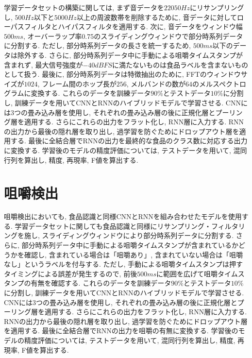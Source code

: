 学習データセットの構築に関しては, まず音データを$22050Hz$にリサンプリングし, $500Hz$以下と$5000Hz$以上の周波数帯を削除するために, 音データに対してローパスフィルタとハイパスフィルタを適用する. 次に, 音データをウィンドウ幅$500ms$, オーバーラップ率$0.75$のスライディングウィンドウで部分時系列データに分割する. ただし, 部分時系列データの長さを統一するため, $500ms$以下のデータは除外する. さらに, 部分時系列データ中に手動による咀嚼タイムスタンプが含まれず, 最大信号強度が$-40dBFS$に満たないものは食品ラベルを含まないものとして扱う. 最後に, 部分時系列データは特徴抽出のために, FFTのウィンドウサイズが$1024$, フレーム間のホップ長が$256$, メルバンドの数が$64$のメルスペクトログラムに変換する. これらのデータを訓練データ$90\%$とテストデータ$10\%$に分割し, 訓練データを用いてCNNとRNNのハイブリッドモデルで学習させる. CNNには3つの畳み込み層を使用し, それぞれの畳み込み層の後に正規化層とプーリング層を適用する. さらにこれらの出力をフラット化し, RNN層に入力する. RNNの出力から最後の隠れ層を取り出し, 過学習を防ぐためにドロップアウト層を適用する. 最後に全結合層でRNNの出力を最終的な食品のクラス数に対応する出力に変換する. 学習後のモデルの精度評価については, テストデータを用いて, 混同行列を算出し, 精度, 再現率, F値を算出する.


\section{咀嚼検出}

咀嚼検出においても, 食品認識と同様CNNとRNNを組み合わせたモデルを使用する. 学習データセットに関しても食品認識と同様にリサンプリング・フィルタリングを施し, スライディングウィンドウにより部分時系列データに分割する. さらに, 部分時系列データ中に手動による咀嚼タイムスタンプが含まれているかどうかを確認し, 含まれている場合は「咀嚼あり」, 含まれていない場合は「咀嚼なし」というラベルを付与する. ただし, 手動による咀嚼タイムスタンプは押すタイミングによる誤差が発生するので, 前後$500ms$に範囲を広げて咀嚼タイムスタンプの有無を確認する. これらのデータを訓練データ$90\%$とテストデータ$10\%$に分割し, 訓練データを用いてCNNとRNNのハイブリッドモデルで学習させる. CNNには3つの畳み込み層を使用し, それぞれの畳み込み層の後に正規化層とプーリング層を適用する. さらにこれらの出力をフラット化し, RNN層に入力する. RNNの出力から最後の隠れ層を取り出し, 過学習を防ぐためにドロップアウト層を適用する. 最後に全結合層でRNNの出力を咀嚼の有無に変換する. 学習後のモデルの精度評価については, テストデータを用いて, 混同行列を算出し, 精度, 再現率, F値を算出する.

